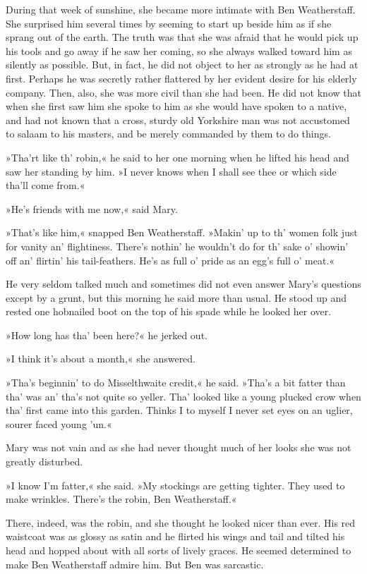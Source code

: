 During that week of sunshine, she became more intimate with Ben Weatherstaff. She surprised him several times by seeming to start up beside him as if she sprang out of the earth. The truth was that she was afraid that he would pick up his tools and go away if he saw her coming, so she always walked toward him as silently as possible. But, in fact, he did not object to her as strongly as he had at first. Perhaps he was secretly rather flattered by her evident desire for his elderly company. Then, also, she was more civil than she had been. He did not know that when she first saw him she spoke to him as she would have spoken to a native, and had not known that a cross, sturdy old Yorkshire man was not accustomed to salaam to his masters, and be merely commanded by them to do things.

»Tha'rt like th' robin,« he said to her one morning when he lifted his head and saw her standing by him. »I never knows when I shall see thee or which side tha'll come from.«

»He's friends with me now,« said Mary.

»That's like him,« snapped Ben Weatherstaff. »Makin' up to th' women folk just for vanity an' flightiness. There's nothin' he wouldn't do for th' sake o' showin' off an' flirtin' his tail-feathers. He's as full o' pride as an egg's full o' meat.«

He very seldom talked much and sometimes did not even answer Mary's questions except by a grunt, but this morning he said more than usual. He stood up and rested one hobnailed boot on the top of his spade while he looked her over.

»How long has tha' been here?« he jerked out.

»I think it's about a month,« she answered.

»Tha's beginnin' to do Misselthwaite credit,« he said. »Tha's a bit fatter than tha' was an' tha's not quite so yeller. Tha' looked like a young plucked crow when tha' first came into this garden. Thinks I to myself I never set eyes on an uglier, sourer faced young 'un.«

Mary was not vain and as she had never thought much of her looks she was not greatly disturbed.

»I know I'm fatter,« she said. »My stockings are getting tighter. They used to make wrinkles. There's the robin, Ben Weatherstaff.«

There, indeed, was the robin, and she thought he looked nicer than ever. His red waistcoat was as glossy as satin and he flirted his wings and tail and tilted his head and hopped about with all sorts of lively graces. He seemed determined to make Ben Weatherstaff admire him. But Ben was sarcastic.


